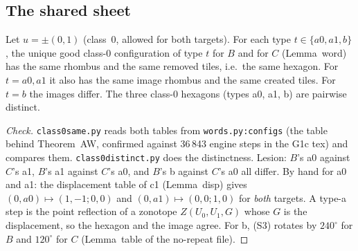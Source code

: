 \documentclass[11pt]{article}
\theoremstyle{definition}\newtheorem{definition}[theorem]{Definition}\newtheorem{remark}[theorem]{Remark}
\begin{document}
\subsection{The shared sheet}
\begin{lemma}\label{lem:shared}
Let $u=\pm(0,1)$ (class~$0$, allowed for both targets). For each type $t\in\{a0,a1,b\}$, the unique good class-$0$ configuration of type $t$ for $B$ and for $C$ (Lemma~word) has the same rhombus and the same removed tiles, i.e.\ the same hexagon. For $t=a0,a1$ it also has the same image rhombus and the same created tiles. For $t=b$ the images differ.
The three class-0 hexagons (types a0, a1, b) are pairwise distinct.
\end{lemma}
\begin{proof}[Check]
\texttt{class0same.py} reads both tables from \texttt{words.py:configs} (the table behind Theorem~AW, confirmed against 36\,843 engine steps in the G1c tex) and compares them. \texttt{class0distinct.py} does the distinctness. Lesion: $B$'s a0 against $C$'s a1, $B$'s a1 against $C$'s a0, and $B$'s b against $C$'s a0 all differ.
By hand for a0 and a1: the displacement table of c1 (Lemma~disp) gives $(0,a0)\mapsto(1,-1;0,0)$ and $(0,a1)\mapsto(0,0;1,0)$ for \emph{both} targets. A type-a step is the point reflection of a zonotope $Z(U_0,U_1,G)$ whose $G$ is the displacement, so the hexagon and the image agree. For b, (S3) rotates by $240^\circ$ for $B$ and $120^\circ$ for $C$ (Lemma~table of the no-repeat file).
\end{proof}
\end{document}
